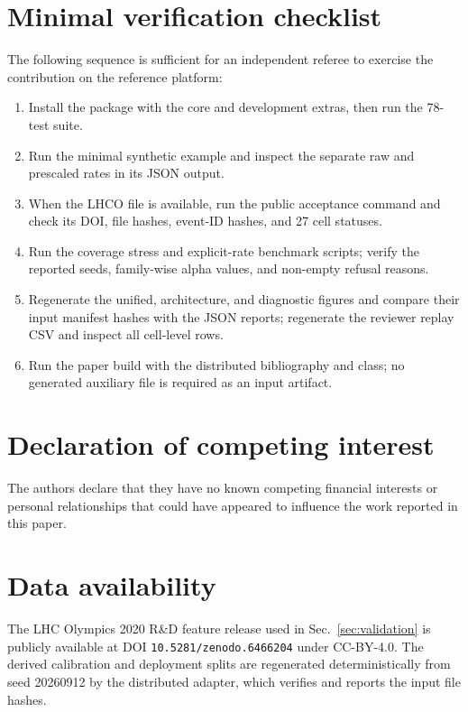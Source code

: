 \documentclass[preprint,12pt]{elsarticle}
\begin{document}
\section{Minimal verification checklist}
\label{app:checklist}

The following sequence is sufficient for an independent referee to exercise
the contribution on the reference platform:

\begin{enumerate}
\item Install the package with the core and development extras, then run the
      78-test suite.
\item Run the minimal synthetic example and inspect the separate raw and
      prescaled rates in its JSON output.
\item When the LHCO file is available, run the public acceptance command and
      check its DOI, file hashes, event-ID hashes, and 27 cell statuses.
\item Run the coverage stress and explicit-rate benchmark scripts; verify the
      reported seeds, family-wise alpha values, and non-empty refusal reasons.
\item Regenerate the unified, architecture, and diagnostic figures and compare
      their input manifest hashes with the JSON reports; regenerate the
      reviewer replay CSV and inspect all cell-level rows.
\item Run the paper build with the distributed bibliography and class; no
      generated auxiliary file is required as an input artifact.
\end{enumerate}

\section*{Declaration of competing interest}
The authors declare that they have no known competing financial interests or
personal relationships that could have appeared to influence the work reported
in this paper.

\section*{Data availability}
The LHC Olympics 2020 R\&D feature release used in Sec.~\ref{sec:validation} is
publicly available at DOI \texttt{10.5281/zenodo.6466204} under CC-BY-4.0.  The
derived calibration and deployment splits are regenerated deterministically
from seed 20260912 by the distributed adapter, which verifies and reports the
input file hashes.
\end{document}
